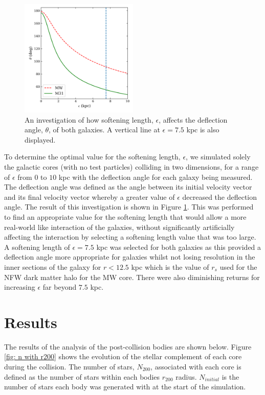 \documentclass[10pt, twocolumn]{revtex4}    %
\begin{document}
\begin{figure}[t!]
\centering
\includegraphics[width=0.5\textwidth]{20180315_010154_SOFTENING_DEFLECTION__5_Gyrs}
\caption{An investigation of how softening length, $\epsilon$, affects the deflection angle, $\theta$, of both galaxies. A vertical line at $\epsilon = 7.5$ kpc is also displayed.}
\label{fig: softening length comparison}
\end{figure}

To determine the optimal value for the softening length, $\epsilon$, we simulated solely the galactic cores (with no test particles) colliding in two dimensions, for a range of $\epsilon$ from $0$ to $10$ kpc with the deflection angle for each galaxy being measured. The deflection angle was defined as the angle between its initial velocity vector and its final  velocity vector whereby a greater value of $\epsilon$ decreased the deflection angle. The result of this investigation is shown in Figure \ref{fig: softening length comparison}. This was performed to find an appropriate value for the softening length that would allow a more real-world like interaction of the galaxies, without significantly artificially affecting the interaction by selecting a softening length value that was too large.  A softening length of $\epsilon=7.5$ kpc was selected for both galaxies as this provided a deflection angle more appropriate for galaxies whilst not losing  resolution in the inner sections of the galaxy for $r<12.5$ kpc which is the value of $r_s$ used for the NFW dark matter halo for the MW core. There were also diminishing returns for increasing $\epsilon$ far beyond $7.5$ kpc.
 
\section{Results} 

The results of the analysis of the post-collision bodies are shown below. Figure \ref{fig: n with r200} shows the evolution of the stellar complement of each core during the collision. The number of stars, $N_{200}$, associated with each core is defined as the number of stars within each bodies $r_{200}$ radius. $N_{initial}$ is the number of stars each body was generated with at the start of the simulation.
\end{document}
